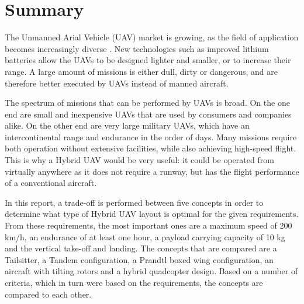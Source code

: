 \chapter*{Summary} %

\begin{comment}
- UAV market is growing
- Dull, dirty, dangerous missions
New technologies such as improved Lithium batteries allow the UAVs to be developed further and further. Since a large amount of missions is either dull, dirty or dangerous, a demand for drones makes sense. Such boring or life-threatening missions, that have been performed using manned aircraft in the past, are a great opportunity for UAVs.  
\end{comment}

The Unmanned Arial Vehicle (UAV) market is growing\footnotemark, as the field of application becomes increasingly diverse \cite{baseline}. New technologies such as improved lithium batteries allow the UAVs to be designed lighter and smaller, or to increase their range. A large amount of missions is either dull, dirty or dangerous, and are therefore better executed by UAVs instead of manned aircraft. 



The spectrum of missions that can be performed by UAVs is broad. On the one end are small and inexpensive UAVs that are used by consumers and companies alike. On the other end are very large military UAVs, which have an intercontinental range and endurance in the order of days. Many missions require both operation without extensive facilities, while also achieving high-speed flight. This is why a Hybrid UAV would be very useful: it could be operated from virtually anywhere as it does not require a runway, but has the flight performance of a conventional aircraft.

\begin{comment}
- Compare concepts
- Find optimal concept that is able to meet the requirements
\end{comment}

In this report, a trade-off is performed between five concepts in order to determine what type of Hybrid UAV layout is optimal for the given requirements. From these requirements, the most important ones are a maximum speed of 200 km/h, an endurance of at least one hour, a payload carrying capacity of 10 kg and the vertical take-off and landing. The concepts that are compared are a Tailsitter, a Tandem configuration, a Prandtl boxed wing configuration, an aircraft with tilting rotors and a hybrid quadcopter design. Based on a number of criteria, which in turn were based on the requirements, the concepts are compared to each other. 



